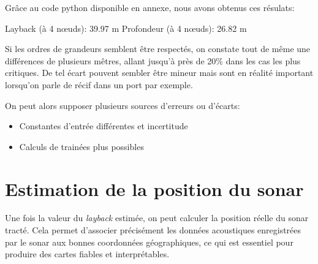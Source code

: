 \documentclass[12pt,a4paper]{report}
\begin{document}
Grâce au code python disponible en annexe, nous avons obtenus ces résulats:

Layback (à 4 nœuds): 39.97 m
Profondeur (à 4 nœuds): 26.82 m

Si les ordres de grandeurs semblent être respectés, on constate tout de même une différences de plusieurs mêtres,
allant jusqu'à près de 20\% dans les cas les plus critiques.
De tel écart pouvent sembler être mineur mais sont en réalité important lorsqu'on parle de récif dans un port par exemple.

On peut alors supposer plusieurs sources d'erreurs ou d'écarts:
\begin{itemize}
  \item Constantes d'entrée différentes et incertitude
  \item Calculs de trainées plus possibles
\end{itemize}


\section{Estimation de la position du sonar}
\begin{figure}[H]
\end{figure}




Une fois la valeur du \textit{layback} estimée, on peut calculer la position réelle du sonar tracté. Cela permet d’associer précisément les données acoustiques enregistrées par le sonar aux bonnes coordonnées géographiques, ce qui est essentiel pour produire des cartes fiables et interprétables.
\end{document}

